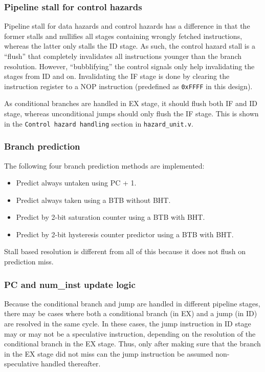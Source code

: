 \documentclass[12pt]{article}
\begin{document}
\subsubsection{Pipeline stall for control hazards}
Pipeline stall for data hazards and control hazards has a difference
in that the former stalls and nullifies all stages containing wrongly
fetched instructions, whereas the latter only stalls the ID stage.  As
such, the control hazard stall is a ``flush'' that completely
invalidates all instructions younger than the branch
resolution. However, ``bubblifying'' the control signals only help
invalidating the stages from ID and on.  Invalidating the IF stage is
done by clearing the instruction register to a NOP instruction
(predefined as \texttt{0xFFFF} in this design).

As conditional branches are handled in EX stage, it should flush both
IF and ID stage, whereas unconditional jumps should only flush the IF
stage.  This is shown in the \texttt{Control hazard handling} section
in \verb|hazard_unit.v|.

\subsubsection{Branch prediction} \label{sec:bpred}
The following four branch prediction methods are implemented:

\begin{itemize}
\item Predict always untaken using PC + 1.
\item Predict always taken using a BTB without BHT.
\item Predict by 2-bit saturation counter using a BTB with BHT.
\item Predict by 2-bit hysteresis counter predictor using a BTB with
  BHT.
\end{itemize}

Stall based resolution is different from all of this because it does
not flush on prediction miss.

\subsubsection{PC and num\_inst update logic}
Because the conditional branch and jump are handled in different
pipeline stages, there may be cases where both a conditional branch
(in EX) and a jump (in ID) are resolved in the same cycle.  In these
cases, the jump instruction in ID stage may or may not be a
speculative instruction, depending on the resolution of the
conditional branch in the EX stage.  Thus, only after making sure that
the branch in the EX stage did not miss can the jump instruction be
assumed non-speculative handled thereafter.
\end{document}
